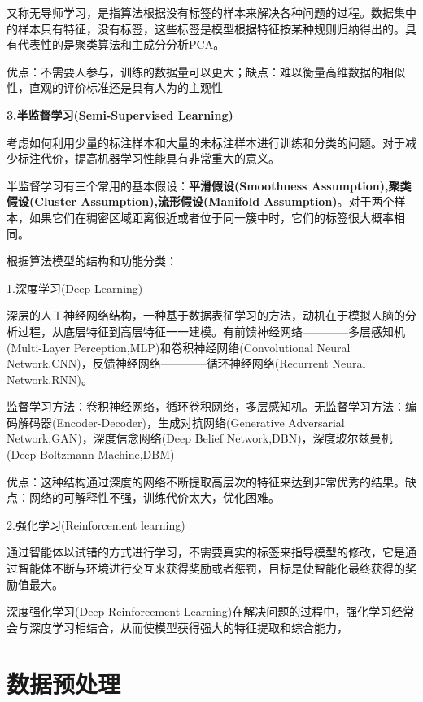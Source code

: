 \documentclass[openbib]{article}
\begin{document}
又称无导师学习，是指算法根据没有标签的样本来解决各种问题的过程。数据集中的样本只有特征，没有标签，这些标签是模型根据特征按某种规则归纳得出的。具有代表性的是聚类算法和主成分分析PCA。

优点：不需要人参与，训练的数据量可以更大；缺点：难以衡量高维数据的相似性，直观的评价标准还是具有人为的主观性

\begin{center}
	\textbf{3.半监督学习(Semi-Supervised Learning)}
\end{center}

考虑如何利用少量的标注样本和大量的未标注样本进行训练和分类的问题。对于减少标注代价，提高机器学习性能具有非常重大的意义。

半监督学习有三个常用的基本假设：\textbf{平滑假设(Smoothness Assumption),聚类假设(Cluster Assumption),流形假设(Manifold Assumption)}。对于两个样本，如果它们在稠密区域距离很近或者位于同一簇中时，它们的标签很大概率相同。

根据算法模型的结构和功能分类：
\begin{center}
	1.深度学习(Deep Learning)
\end{center}

深层的人工神经网络结构，一种基于数据表征学习的方法，动机在于模拟人脑的分析过程，从底层特征到高层特征一一建模。有前馈神经网络————多层感知机(Multi-Layer Perception,MLP)和卷积神经网络(Convolutional Neural Network,CNN)，反馈神经网络————循环神经网络(Recurrent Neural Network,RNN)。

监督学习方法：卷积神经网络，循环卷积网络，多层感知机。无监督学习方法：编码解码器(Encoder-Decoder)，生成对抗网络(Generative Adversarial Network,GAN)，深度信念网络(Deep Belief Network,DBN)，深度玻尔兹曼机(Deep Boltzmann Machine,DBM)

优点：这种结构通过深度的网络不断提取高层次的特征来达到非常优秀的结果。缺点：网络的可解释性不强，训练代价太大，优化困难。
\begin{center}
	2.强化学习(Reinforcement learning)
\end{center}

通过智能体以试错的方式进行学习，不需要真实的标签来指导模型的修改，它是通过智能体不断与环境进行交互来获得奖励或者惩罚，目标是使智能化最终获得的奖励值最大。

深度强化学习(Deep Reinforcement Learning)在解决问题的过程中，强化学习经常会与深度学习相结合，从而使模型获得强大的特征提取和综合能力，
\section{数据预处理}
\end{document}
